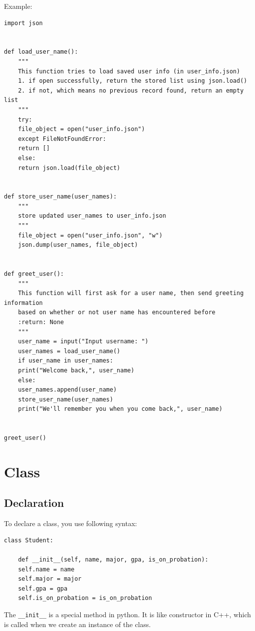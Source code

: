 \documentclass[12pt]{book}
\begin{document}
Example:
\begin{verbatim}
import json


def load_user_name():
    """
    This function tries to load saved user info (in user_info.json)
    1. if open successfully, return the stored list using json.load()
    2. if not, which means no previous record found, return an empty list
    """
    try:
	file_object = open("user_info.json")
    except FileNotFoundError:
	return []
    else:
	return json.load(file_object)


def store_user_name(user_names):
    """
    store updated user_names to user_info.json
    """
    file_object = open("user_info.json", "w")
    json.dump(user_names, file_object)


def greet_user():
    """
    This function will first ask for a user name, then send greeting information
    based on whether or not user name has encountered before
    :return: None
    """
    user_name = input("Input username: ")
    user_names = load_user_name()
    if user_name in user_names:
	print("Welcome back,", user_name)
    else:
	user_names.append(user_name)
	store_user_name(user_names)
	print("We'll remember you when you come back,", user_name)


greet_user()

\end{verbatim}
\chapter{Class}
\label{sec:orgf1b196b}
\section{Declaration}
\label{sec:orgcd47a47}
To declare a class, you use following syntax:
\begin{verbatim}
class Student:

    def __init__(self, name, major, gpa, is_on_probation):
	self.name = name
	self.major = major
	self.gpa = gpa
	self.is_on_probation = is_on_probation
\end{verbatim}
The \texttt{\_\_init\_\_} is a special method in python. It is like constructor in C++, which is called when we create an instance of the class.
\end{document}
